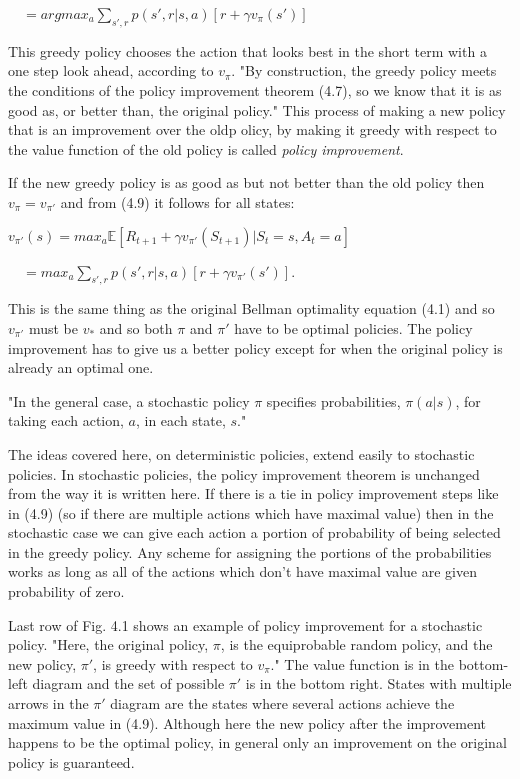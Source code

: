 \documentclass[11pt]{article}
\begin{document}
\(\quad = argmax_a \sum_{s', r} p(s', r | s, a)[r + \gamma v_\pi(s')]\)

This greedy policy chooses the action that looks best in the short term
with a one step look ahead, according to \(v_\pi\). "By construction,
the greedy policy meets the conditions of the policy improvement theorem
(4.7), so we know that it is as good as, or better than, the original
policy." This process of making a new policy that is an improvement over
the oldp olicy, by making it greedy with respect to the value function
of the old policy is called \emph{policy improvement}.

    If the new greedy policy is as good as but not better than the old
policy then \(v_\pi = v_{\pi'}\) and from (4.9) it follows for all
states:

\(v_{\pi'}(s) = max_a \mathbb{E}[R_{t+1} + \gamma v_{\pi'}(S_{t+1}) | S_t = s, A_t = a]\)

\(\quad = max_a \sum_{s', r} p(s', r | s, a)[r + \gamma v_{\pi'}(s')]\).

This is the same thing as the original Bellman optimality equation (4.1)
and so \(v_{\pi'}\) must be \(v_*\) and so both \(\pi\) and \(\pi'\)
have to be optimal policies. The policy improvement has to give us a
better policy except for when the original policy is already an optimal
one.

"In the general case, a stochastic policy \(\pi\) specifies
probabilities, \(\pi(a|s)\), for taking each action, \(a\), in each
state, \(s\)."

The ideas covered here, on deterministic policies, extend easily to
stochastic policies. In stochastic policies, the policy improvement
theorem is unchanged from the way it is written here. If there is a tie
in policy improvement steps like in (4.9) (so if there are multiple
actions which have maximal value) then in the stochastic case we can
give each action a portion of probability of being selected in the
greedy policy. Any scheme for assigning the portions of the
probabilities works as long as all of the actions which don't have
maximal value are given probability of zero.

Last row of Fig. 4.1 shows an example of policy improvement for a
stochastic policy. "Here, the original policy, \(\pi\), is the
equiprobable random policy, and the new policy, \(\pi'\), is greedy with
respect to \(v_\pi\)." The value function is in the bottom-left diagram
and the set of possible \(\pi'\) is in the bottom right. States with
multiple arrows in the \(\pi'\) diagram are the states where several
actions achieve the maximum value in (4.9). Although here the new policy
after the improvement happens to be the optimal policy, in general only
an improvement on the original policy is guaranteed.
\end{document}

